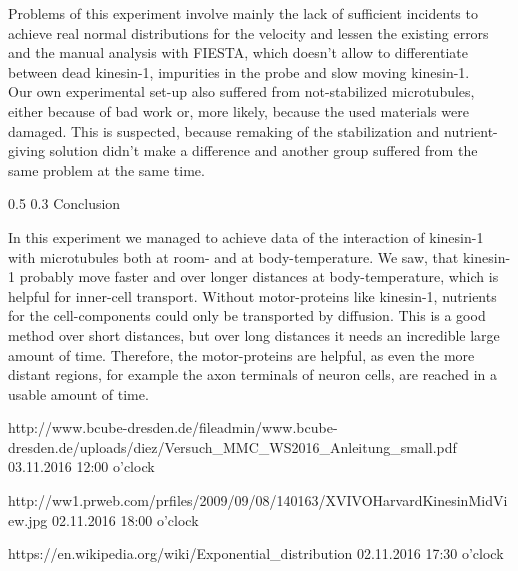 \documentclass[english, %
parskip=full, %
bibliography=totoc, %
]{scrartcl}
\makeatletter
\renewcommand\subsection{\@startsection 
   {subsection}{2}{0mm}%
   {0.5\baselineskip}%
   {0.3\baselineskip}%
   {\bfseries\sffamily\large}%
   }
\makeatother
\begin{document}
Problems of this experiment involve mainly the lack of sufficient incidents to achieve real normal distributions for the velocity and lessen the existing errors and the manual analysis with FIESTA, which doesn't allow to differentiate between dead kinesin-1, impurities in the probe and slow moving kinesin-1. \\
Our own experimental set-up also suffered from not-stabilized microtubules, either because of bad work or, more likely, because the used materials were damaged. This is suspected, because remaking of the stabilization and nutrient-giving solution didn't make a difference and another group suffered from the same problem at the same time.

\subsection{Conclusion}

In this experiment we managed to achieve data of the interaction of kinesin-1 with microtubules both at room- and at body-temperature. We saw, that kinesin-1 probably move faster and over longer distances at body-temperature, which is helpful for inner-cell transport. Without motor-proteins like kinesin-1, nutrients for the cell-components could only be transported by diffusion. This is a good method over short distances, but over long distances it needs an incredible large amount of time. Therefore, the motor-proteins are helpful, as even the more distant regions, for example the axon terminals of neuron cells, are reached in a usable amount of time.  


\begin{thebibliography}{9}

  http://www.bcube-dresden.de/fileadmin/www.bcube-dresden.de/uploads/diez/Versuch\_MMC\_WS2016\_Anleitung\_small.pdf
	03.11.2016
	12:00 o'clock

  http://ww1.prweb.com/prfiles/2009/09/08/140163/XVIVOHarvardKinesinMidView.jpg
	02.11.2016
	18:00 o'clock
	
  https://en.wikipedia.org/wiki/Exponential\_distribution
	02.11.2016
	17:30 o'clock

\end{thebibliography}
\end{document}
